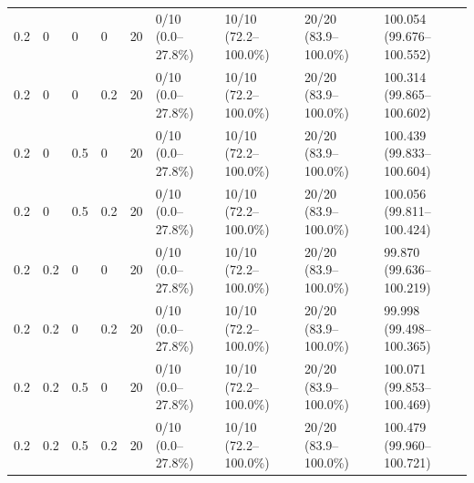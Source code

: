 \begin{tabular}{lllllllll}
0.2 & 0 & 0 & 0 & 20 & 0/10 (0.0--27.8\%) & 10/10 (72.2--100.0\%) & 20/20 (83.9--100.0\%) & 100.054 (99.676--100.552) \\
0.2 & 0 & 0 & 0.2 & 20 & 0/10 (0.0--27.8\%) & 10/10 (72.2--100.0\%) & 20/20 (83.9--100.0\%) & 100.314 (99.865--100.602) \\
0.2 & 0 & 0.5 & 0 & 20 & 0/10 (0.0--27.8\%) & 10/10 (72.2--100.0\%) & 20/20 (83.9--100.0\%) & 100.439 (99.833--100.604) \\
0.2 & 0 & 0.5 & 0.2 & 20 & 0/10 (0.0--27.8\%) & 10/10 (72.2--100.0\%) & 20/20 (83.9--100.0\%) & 100.056 (99.811--100.424) \\
0.2 & 0.2 & 0 & 0 & 20 & 0/10 (0.0--27.8\%) & 10/10 (72.2--100.0\%) & 20/20 (83.9--100.0\%) & 99.870 (99.636--100.219) \\
0.2 & 0.2 & 0 & 0.2 & 20 & 0/10 (0.0--27.8\%) & 10/10 (72.2--100.0\%) & 20/20 (83.9--100.0\%) & 99.998 (99.498--100.365) \\
0.2 & 0.2 & 0.5 & 0 & 20 & 0/10 (0.0--27.8\%) & 10/10 (72.2--100.0\%) & 20/20 (83.9--100.0\%) & 100.071 (99.853--100.469) \\
0.2 & 0.2 & 0.5 & 0.2 & 20 & 0/10 (0.0--27.8\%) & 10/10 (72.2--100.0\%) & 20/20 (83.9--100.0\%) & 100.479 (99.960--100.721) \\
\hline
\end{tabular}
